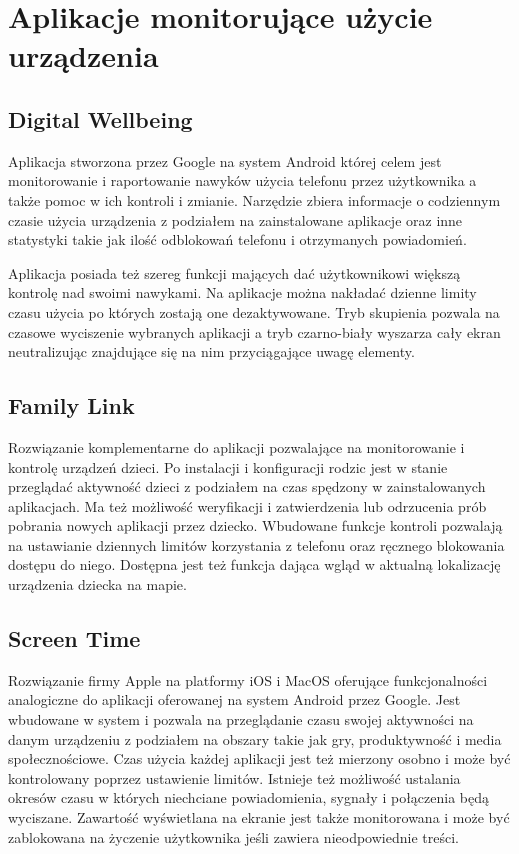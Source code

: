 \section{Aplikacje monitorujące użycie urządzenia}

\subsection{Digital Wellbeing}
\label{sec:digital_wellbeing}
Aplikacja stworzona przez Google na system Android której celem jest monitorowanie i raportowanie nawyków użycia telefonu przez użytkownika a także pomoc w ich kontroli i zmianie. Narzędzie zbiera informacje o codziennym czasie użycia urządzenia z podziałem na zainstalowane aplikacje oraz inne statystyki takie jak ilość odblokowań telefonu i otrzymanych powiadomień. 
\bigskip
{}

Aplikacja posiada też szereg funkcji mających dać użytkownikowi większą kontrolę nad swoimi nawykami. Na aplikacje można nakładać dzienne limity czasu użycia po których zostają one dezaktywowane. Tryb skupienia pozwala na czasowe wyciszenie wybranych aplikacji a tryb czarno-biały wyszarza cały ekran neutralizując znajdujące się na nim przyciągające uwagę elementy.

\subsection{Family Link}
Rozwiązanie komplementarne do aplikacji  pozwalające na monitorowanie i kontrolę urządzeń dzieci. Po instalacji i konfiguracji rodzic jest w stanie przeglądać aktywność dzieci z podziałem na czas spędzony w zainstalowanych aplikacjach. Ma też możliwość weryfikacji i zatwierdzenia lub odrzucenia prób pobrania nowych aplikacji przez dziecko. Wbudowane funkcje kontroli pozwalają na ustawianie dziennych limitów korzystania z telefonu oraz ręcznego blokowania dostępu do niego. Dostępna jest też funkcja dająca wgląd w aktualną lokalizację urządzenia dziecka na mapie.

\subsection{Screen Time}
Rozwiązanie firmy Apple na platformy iOS i MacOS oferujące funkcjonalności analogiczne do aplikacji  oferowanej na system Android przez Google. Jest wbudowane w system i pozwala na przeglądanie czasu swojej aktywności na danym urządzeniu z podziałem na obszary takie jak gry, produktywność i media społecznościowe. Czas użycia każdej aplikacji jest też mierzony osobno i może być kontrolowany poprzez ustawienie limitów. Istnieje też możliwość ustalania okresów czasu w których niechciane powiadomienia, sygnały i połączenia będą wyciszane. Zawartość wyświetlana na ekranie jest także monitorowana i może być zablokowana na życzenie użytkownika jeśli zawiera nieodpowiednie treści.

